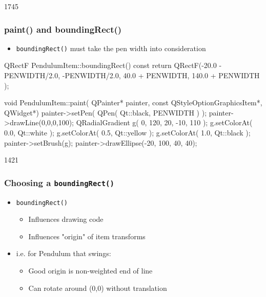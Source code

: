 \begin{slide}[fragile]{1745}
\frametitle{paint() and boundingRect()}
\begin{itemize}
\item \texttt{boundingRect()} must take the pen width into consideration
\end{itemize}
\begin{cpp}
QRectF PendulumItem::boundingRect() const {
    return QRectF(-20.0 - PENWIDTH/2.0, -PENWIDTH/2.0,
                  40.0 + PENWIDTH, 140.0 + PENWIDTH );
}

void PendulumItem::paint( QPainter* painter,
    const QStyleOptionGraphicsItem*, QWidget*) {
    painter->setPen( QPen( Qt::black, PENWIDTH ) );
    painter->drawLine(0,0,0,100);
    QRadialGradient g( 0, 120, 20, -10, 110 );
    g.setColorAt( 0.0, Qt::white );
    g.setColorAt( 0.5, Qt::yellow );
    g.setColorAt( 1.0, Qt::black );
    painter->setBrush(g);
    painter->drawEllipse(-20, 100, 40, 40);
}
\end{cpp}
\end{slide}

\begin{slide}{1421}
\frametitle{Choosing a \texttt{boundingRect()}}
\begin{itemize}
\item \texttt{boundingRect()}
    \begin{itemize}
    \item Influences drawing code
    \item Influences "origin" of item transforms
    \end{itemize}
\item i.e. for Pendulum that swings:
    \begin{itemize}
    \item Good origin is non-weighted end of line
    \item Can rotate around (0,0) without translation
    \end{itemize}
\end{itemize}

\end{slide}

